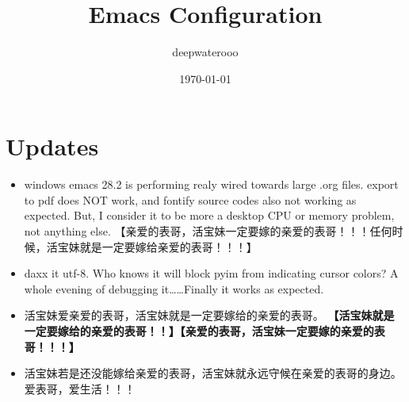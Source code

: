 \documentclass[9pt, b5paper]{article}
\author{deepwaterooo}
\date{\today}
\title{Emacs Configuration}
\begin{document}
\maketitle
\tableofcontents


\section{Updates}
\label{sec:org462f51c}
\begin{itemize}
\item windows emacs 28.2 is performing realy wired towards large .org files. export to pdf does NOT work, and fontify source codes also not working as expected. But, I consider it to be more a desktop CPU or memory problem, not anything else. 【亲爱的表哥，活宝妹一定要嫁的亲爱的表哥！！！任何时候，活宝妹就是一定要嫁给亲爱的表哥！！！】
\item daxx it utf-8. Who knows it will block pyim from indicating cursor colors? A whole evening of debugging it\ldots{}\ldots{}Finally it works as expected.
\item 活宝妹爱亲爱的表哥，活宝妹就是一定要嫁给的亲爱的表哥。 \textbf{【活宝妹就是一定要嫁给的亲爱的表哥！！】【亲爱的表哥，活宝妹一定要嫁的亲爱的表哥！！！】}
\item 活宝妹若是还没能嫁给亲爱的表哥，活宝妹就永远守候在亲爱的表哥的身边。爱表哥，爱生活！！！
\end{itemize}
\end{document}
